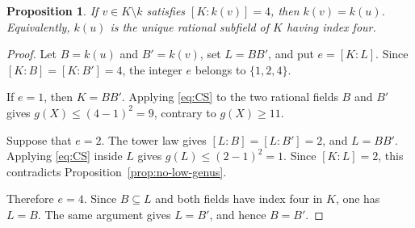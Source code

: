 \documentclass[10pt,a4paper]{amsart}
\newtheorem{proposition}{Proposition}
\begin{document}
\begin{proposition}\label{prop:unique}
If $v\in K\setminus k$ satisfies $[K:k(v)]=4$, then $k(v)=k(u)$. Equivalently, $k(u)$ is the unique rational subfield of $K$ having index four.
\end{proposition}

\begin{proof}
Let $B=k(u)$ and $B'=k(v)$, set $L=BB'$, and put $e=[K:L]$. Since $[K:B]=[K:B']=4$, the integer $e$ belongs to $\{1,2,4\}$.

If $e=1$, then $K=BB'$. Applying \eqref{eq:CS} to the two rational fields $B$ and $B'$ gives $g(X)\leq(4-1)^2=9$, contrary to $g(X)\geq11$.

Suppose that $e=2$. The tower law gives $[L:B]=[L:B']=2$, and $L=BB'$. Applying \eqref{eq:CS} inside $L$ gives $g(L)\leq(2-1)^2=1$. Since $[K:L]=2$, this contradicts Proposition~\ref{prop:no-low-genus}.

Therefore $e=4$. Since $B\subseteq L$ and both fields have index four in $K$, one has $L=B$. The same argument gives $L=B'$, and hence $B=B'$.
\end{proof}
\end{document}
